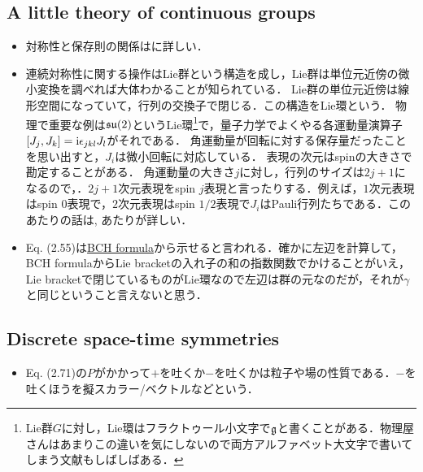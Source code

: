 \subsection{A little theory of continuous groups}
\begin{itemize}
		\item 対称性と保存則の関係は\cite[Chap.10, Sec.4]{BB17130464}に詳しい．
		\item 連続対称性に関する操作はLie群という構造を成し，Lie群は単位元近傍の微小変換を調べれば大体わかることが知られている．
				Lie群の単位元近傍は線形空間になっていて，行列の交換子で閉じる．この構造をLie環という．
				物理で重要な例は$\mathfrak{su}(2) $というLie環\footnote{Lie群$G$に対し，Lie環はフラクトゥール小文字で$\mathfrak{g}$と書くことがある．物理屋さんはあまりこの違いを気にしないので両方アルファベット大文字で書いてしまう文献もしばしばある．}で，量子力学でよくやる各運動量演算子$[J_j, J_k] = \mathrm{i}\epsilon_{jkl}J_l $がそれである．
				角運動量が回転に対する保存量だったことを思い出すと，$J_i$は微小回転に対応している．
				表現の次元はspinの大きさで勘定することがある．
				角運動量の大きさ$j $に対し，行列のサイズは$2j + 1 $になるので，．$2j+1 $次元表現をspin $j $表現と言ったりする．例えば，$1 $次元表現はspin $0 $表現で，$2 $次元表現はspin $1/2 $表現で$J_i $はPauli行列たちである．このあたりの話は\cite[Chap.3]{BB03663366}, \cite{BN10398292}あたりが詳しい．
		\item Eq. (2.55)は\href{https://en.wikipedia.org/wiki/Baker%E2%80%93Campbell%E2%80%93Hausdorff_formula}{BCH formula}から示せると言われる．確かに左辺を計算して，BCH formulaからLie bracketの入れ子の和の指数関数でかけることがいえ，Lie bracketで閉じているものがLie環なので左辺は群の元なのだが，それが$\gamma $と同じということ言えないと思う．
		\end{itemize}
\subsection{Discrete space-time symmetries}
\begin{itemize}
		\item Eq. (2.71)の$P $がかかって$+ $を吐くか$- $を吐くかは粒子や場の性質である．$- $を吐くほうを擬スカラー/ベクトルなどという．
\end{itemize}
